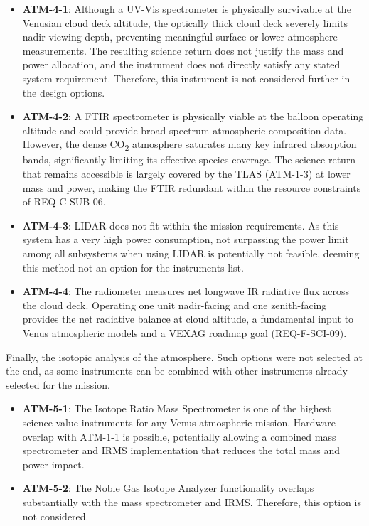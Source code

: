 \begin{itemize}
    \item \textbf{ATM-4-1}: Although a UV-Vis spectrometer is physically survivable at the Venusian cloud deck altitude, the optically thick cloud deck severely limits nadir viewing depth, preventing meaningful surface or lower atmosphere measurements. The resulting science return does not justify the mass and power allocation, and the instrument does not directly satisfy any stated system requirement. Therefore, this instrument is not considered further in the design options.

    \item \textbf{ATM-4-2}: A FTIR spectrometer is physically viable at the balloon operating altitude and could provide broad-spectrum atmospheric composition data. However, the dense CO\textsubscript{2} atmosphere saturates many key infrared absorption bands, significantly limiting its effective species coverage. The science return that remains accessible is largely covered by the TLAS (ATM-1-3) at lower mass and power, making the FTIR redundant within the resource constraints of REQ-C-SUB-06.

    \item \textbf{ATM-4-3}: LIDAR does not fit within the mission requirements. As this system has a very high power consumption, not surpassing the power limit among all subsystems when using LIDAR is potentially not feasible, deeming this method not an option for the instruments list.

    \item \textbf{ATM-4-4}: The radiometer measures net longwave IR radiative flux across the cloud deck. Operating one unit nadir-facing and one zenith-facing provides the net radiative balance at cloud altitude, a fundamental input to Venus atmospheric models and a VEXAG roadmap goal (REQ-F-SCI-09). 
\end{itemize}

Finally, the isotopic analysis of the atmosphere. Such options were not selected at the end, as some instruments can be combined with other instruments already selected for the mission. 

\begin{itemize}
    \item \textbf{ATM-5-1}: The Isotope Ratio Mass Spectrometer is one of the highest science-value instruments for any Venus atmospheric mission. Hardware overlap with ATM-1-1 is possible, potentially allowing a combined mass spectrometer and IRMS implementation that reduces the total mass and power impact.

    \item \textbf{ATM-5-2}: The Noble Gas Isotope Analyzer functionality overlaps substantially with the mass spectrometer and IRMS. Therefore, this option is not considered. 
\end{itemize}

